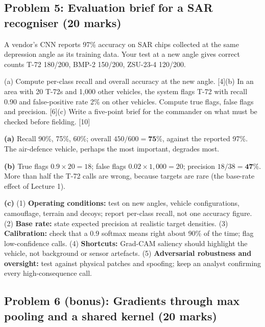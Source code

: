 \documentclass[11pt]{article}
\begin{document}
\subsection{Problem 5: Evaluation brief for a SAR recogniser \normalfont\small\color{GreyN}(20 marks)}

\begin{prob}A vendor's CNN reports 97\% accuracy on SAR chips collected at the same depression angle as its training data. Your test at a new angle gives correct counts T-72 180/200, BMP-2 150/200, ZSU-23-4 120/200.

(a) Compute per-class recall and overall accuracy at the new angle. [4]\newline (b) In an area with 20 T-72s and 1,000 other vehicles, the system flags T-72 with recall 0.90 and false-positive rate 2\% on other vehicles. Compute true flags, false flags and precision. [6]\newline (c) Write a five-point brief for the commander on what must be checked before fielding. [10]\end{prob}

\begin{soln}\textbf{(a)} Recall 90\%, 75\%, 60\%; overall $450/600=\mathbf{75\%}$, against the reported 97\%. The air-defence vehicle, perhaps the most important, degrades most.

\textbf{(b)} True flags $0.9\times20=18$; false flags $0.02\times1{,}000=20$; precision $18/38=\mathbf{47\%}$. More than half the T-72 calls are wrong, because targets are rare (the base-rate effect of Lecture 1).

\textbf{(c)} (1) \textbf{Operating conditions:} test on new angles, vehicle configurations, camouflage, terrain and decoys; report per-class recall, not one accuracy figure. (2) \textbf{Base rate:} state expected precision at realistic target densities. (3) \textbf{Calibration:} check that a 0.9 softmax means right about 90\% of the time; flag low-confidence calls. (4) \textbf{Shortcuts:} Grad-CAM saliency should highlight the vehicle, not background or sensor artefacts. (5) \textbf{Adversarial robustness and oversight:} test against physical patches and spoofing; keep an analyst confirming every high-consequence call.\end{soln}

\subsection{Problem 6 (bonus): Gradients through max pooling and a shared kernel \normalfont\small\color{GreyN}(20 marks)}
\end{document}
